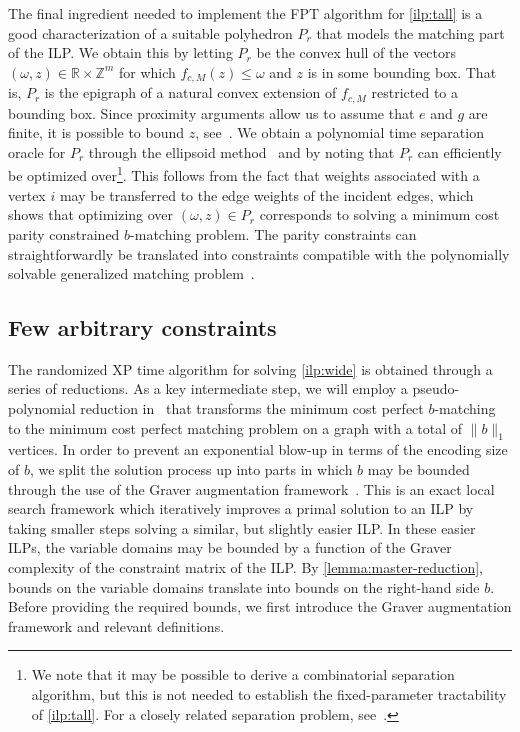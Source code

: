 \documentclass[a4paper,UKenglish,cleveref,thm-restate]{lipics-v2021}
\newcommand{\R}{\mathbb R}
\newcommand{\Z}{\mathbb Z}
\begin{document}
The final ingredient needed to implement the FPT algorithm for \cref{ilp:tall} is a good characterization of a suitable polyhedron $P_r$ that models the matching part of the ILP. We obtain this by letting $P_r$ be the convex hull of the vectors $(\omega,z)\in\R\times\Z^m$ for which $f_{c,M}(z)\le\omega$ and $z$ is in some bounding box. That is, $P_r$ is the epigraph of a natural convex extension of $f_{c,M}$ restricted to a bounding box. Since proximity arguments allow us to assume that $e$ and $g$ are finite, it is possible to bound $z$, see~\cite{DBLP:journals/mp/CookGST86}. We obtain a polynomial time separation oracle for $P_r$ through the ellipsoid method~\cite{DBLP:books/sp/GLS1988} and by noting that $P_r$ can efficiently be optimized over\footnote{We note that it may be possible to derive a combinatorial separation algorithm, but this is not needed to establish the fixed-parameter tractability of \cref{ilp:tall}. For a closely related separation problem, see~\cite{DBLP:journals/mor/Zhang03}.}. This follows from the fact that weights associated with a vertex $i$ may be transferred to the edge weights of the incident edges, which shows that optimizing over $(\omega,z)\in P_r$ corresponds to solving a minimum cost parity constrained $b$-matching problem. The parity constraints can straightforwardly be translated into constraints compatible with the polynomially solvable generalized matching problem~\cite{schrijver2003combinatorial,DBLP:journals/mp/EdmondsJ73}.

\subsection{Few arbitrary constraints}
\label{sec:overview-few-arbitrary-constraints}

The randomized XP time algorithm for solving \cref{ilp:wide} is obtained through a series of reductions. As a key intermediate step, we will employ a pseudo-polynomial reduction in~\cite{schrijver2003combinatorial} that transforms the minimum cost perfect $b$-matching to the minimum cost perfect matching problem on a graph with a total of $\|b\|_1$ vertices. In order to prevent an exponential blow-up in terms of the encoding size of $b$, we split the solution process up into parts in which $b$ may be bounded through the use of the Graver augmentation framework~\cite{eisenbrand2022algorithmictheoryintegerprogramming}. This is an exact local search framework which iteratively improves a primal solution to an ILP by taking smaller steps solving a similar, but slightly easier ILP. In these easier ILPs, the variable domains may be bounded by a function of the Graver complexity of the constraint matrix of the ILP. By \cref{lemma:master-reduction}, bounds on the variable domains translate into bounds on the right-hand side $b$. Before providing the required bounds, we first introduce the Graver augmentation framework and relevant definitions.
\end{document}
